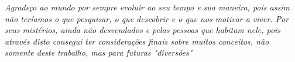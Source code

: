 \begin{dedicatoria}
\vspace*{\fill}
\vspace*{15cm}

\textit{Agradeço ao mundo por sempre evoluir ao seu tempo e sua maneira, pois assim não teríamos o que pesquisar, o que descobrir e o que nos motivar a viver. Por seus mistérios, ainda não desvendados e pelas pessoas que habitam nele, pois através disto consegui ter considerações finais sobre muitos conceitos, não somente deste trabalho, mas para futuras "diversões"}

\vspace*{1cm}
\vspace*{\fill}
\end{dedicatoria}
